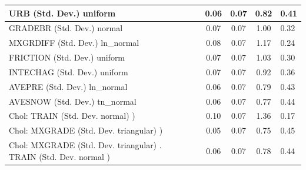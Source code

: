\begin{table}
\begin{center}
\begin{tabular}{|l|l|c|c|c|l|}
			URB (Std. Dev.) uniform &  & 0.06 & 0.07 & 0.82 & 0.41 \\
			\hline
			GRADEBR (Std. Dev.) normal &  & 0.07 & 0.07 & 1.00 & 0.32 \\
			\hline
			MXGRDIFF (Std. Dev.) ln_normal &  & 0.08 & 0.07 & 1.17 & 0.24 \\
			\hline
			FRICTION (Std. Dev.) uniform &  & 0.07 & 0.07 & 1.03 & 0.30 \\
			\hline
			INTECHAG (Std. Dev.) uniform &  & 0.07 & 0.07 & 0.92 & 0.36 \\
			\hline
			AVEPRE (Std. Dev.) ln_normal &  & 0.06 & 0.07 & 0.79 & 0.43 \\
			\hline
			AVESNOW (Std. Dev.) tn_normal &  & 0.06 & 0.07 & 0.77 & 0.44 \\
			\hline
			 Chol: TRAIN (Std. Dev. normal) ) &  & 0.10 & 0.07 & 1.36 & 0.17 \\
			\hline
			 Chol: MXGRADE (Std. Dev. triangular) ) &  & 0.05 & 0.07 & 0.75 & 0.45 \\
			\hline
			 Chol: MXGRADE (Std. Dev. triangular) . TRAIN (Std. Dev.   normal ) &  & 0.06 & 0.07 & 0.78 & 0.44 \\
			\hline
		\end{tabular}
	\end{center}
\end{table}
